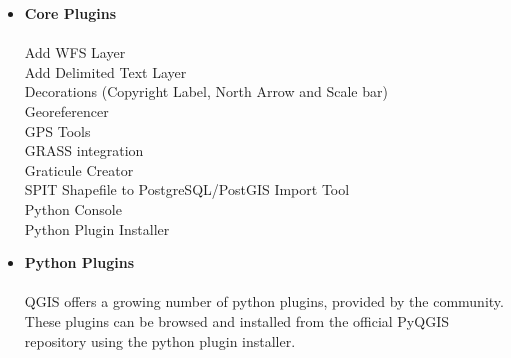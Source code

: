 \begin{itemize}
\item \textbf{Core Plugins}
\\ \\ Add WFS Layer
\\ Add Delimited Text Layer
\\ Decorations (Copyright Label, North Arrow and Scale bar)
\\ Georeferencer
\\ GPS Tools
\\ GRASS integration
\\ Graticule Creator
\\ SPIT Shapefile to PostgreSQL/PostGIS Import Tool
\\ Python Console
\\ Python Plugin Installer
\\ \item \textbf{Python Plugins} 
\\ \\ QGIS offers a growing number of python plugins, provided by the
community. These plugins can be browsed and installed from the official
PyQGIS repository using the python plugin installer.
\end{itemize}








